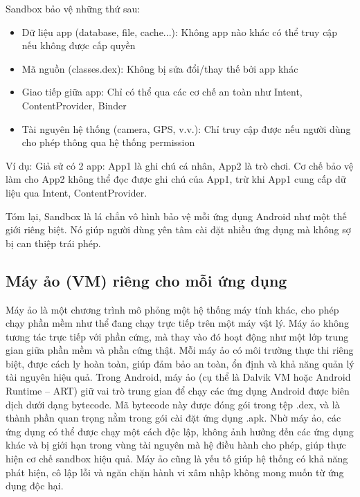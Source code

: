 \newpage
    Sandbox bảo vệ những thứ sau:
      \setlength{\leftmargini}{1.5cm}
      \begin{itemize}
          \item Dữ liệu app (database, file, cache...): Không app nào khác có thể truy cập nếu không được cấp quyền
            \item Mã nguồn (classes.dex): Không bị sửa đổi/thay thế bởi app khác
            \item Giao tiếp giữa app: Chỉ có thể qua các cơ chế an toàn như Intent, ContentProvider, Binder
            \item Tài nguyên hệ thống (camera, GPS, v.v.): Chỉ truy cập được nếu người dùng cho phép thông qua hệ thống permission
        \end{itemize}
        
        \vspace{0.5em}
        Ví dụ: Giả sử có 2 app:
        App1 là ghi chú cá nhân,
        App2 là trò chơi.
        Cơ chế bảo vệ làm cho App2 không thể đọc được ghi chú của App1, trừ khi App1 cung cấp dữ liệu qua Intent, ContentProvider.

        \vspace{0.5em}

        Tóm lại, Sandbox là lá chắn vô hình bảo vệ mỗi ứng dụng Android như một thế giới riêng biệt. Nó giúp người dùng yên tâm cài đặt nhiều ứng dụng mà không sợ bị can thiệp trái phép.

\subsection{Máy ảo (VM) riêng cho mỗi ứng dụng}

  Máy ảo là một chương trình mô phỏng một hệ thống máy tính khác, cho phép chạy phần mềm như thể đang chạy trực tiếp trên một máy vật lý. Máy ảo không tương tác trực tiếp với phần cứng, mà thay vào đó hoạt động như một lớp trung gian giữa phần mềm và phần cứng thật. Mỗi máy ảo có môi trường thực thi riêng biệt, được cách ly hoàn toàn, giúp đảm bảo an toàn, ổn định và khả năng quản lý tài nguyên hiệu quả. Trong Android, máy ảo (cụ thể là Dalvik VM hoặc Android Runtime – ART) giữ vai trò trung gian để chạy các ứng dụng Android được biên dịch dưới dạng bytecode. Mã bytecode này được đóng gói trong tệp .dex, và là thành phần quan trọng nằm trong gói cài đặt ứng dụng .apk. Nhờ máy ảo, các ứng dụng có thể được chạy một cách độc lập, không ảnh hưởng đến các ứng dụng khác và bị giới hạn trong vùng tài nguyên mà hệ điều hành cho phép, giúp thực hiện cơ chế sandbox hiệu quả. Máy ảo cũng là yếu tố giúp hệ thống có khả năng phát hiện, cô lập lỗi và ngăn chặn hành vi xâm nhập không mong muốn từ ứng dụng độc hại.

